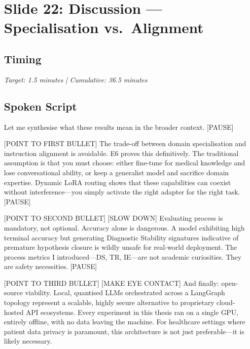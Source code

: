 \documentclass[12pt]{article}
\begin{document}
  \section{Slide 22: Discussion --- Specialisation vs.\ Alignment}

  \subsection*{Timing}
  \textit{Target: 1.5 minutes | Cumulative: 36.5 minutes}

  \subsection*{Spoken Script}
  \begin{spokenbox}
   Let me synthesise what these results mean in the broader context. [PAUSE]

  [POINT TO FIRST BULLET] The trade-off between domain specialisation and instruction alignment is avoidable. E6 proves this definitively. The traditional assumption is that you must choose: either fine-tune for medical knowledge and lose conversational ability, or keep a generalist model and sacrifice domain expertise. Dynamic LoRA routing shows that these capabilities can coexist without interference---you simply activate the right adapter for the right task. [PAUSE]

  [POINT TO SECOND BULLET] [SLOW DOWN] Evaluating process is mandatory, not optional. Accuracy alone is dangerous. A model exhibiting high terminal accuracy but generating Diagnostic Stability signatures indicative of premature hypothesis closure is wildly unsafe for real-world deployment. The process metrics I introduced---DS, TR, IE---are not academic curiosities. They are safety necessities. [PAUSE]

  [POINT TO THIRD BULLET] [MAKE EYE CONTACT] And finally: open-source viability. Local, quantised LLMs orchestrated across a LangGraph topology represent a scalable, highly secure alternative to proprietary cloud-hosted API ecosystems. Every experiment in this thesis ran on a single GPU, entirely offline, with no data leaving the machine. For healthcare settings where patient data privacy is paramount, this architecture is not just preferable---it is likely necessary.
  \end{spokenbox}
\end{document}
